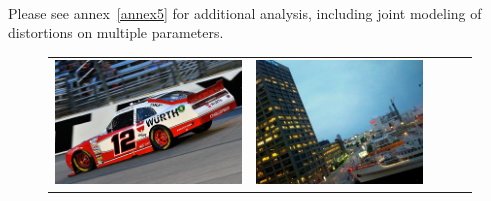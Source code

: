\paragraph{}Please see annex~\ref{annex5} for additional analysis, including joint modeling of distortions on multiple parameters.


\newcommand{\retrievalwidth}{0.12}
\begin{figure}[!ht]
\centering
\footnotesize
\setlength{\tabcolsep}{3pt}
\begin{tabular}{c|cccc}
\includegraphics[height=\retrievalwidth\linewidth]{figures/applications/matching_horizon_group_3/00021396_jpg_0_46409649747812576_original.jpg} &
\includegraphics[height=\retrievalwidth\linewidth]{figures/applications/matching_horizon_group_3/00016279_jpg_0_07618561060718712.jpg} &

\end{tabular}
\end{figure}
